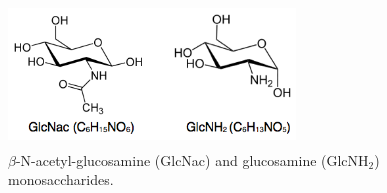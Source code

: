 



\begin{figure}[nag]
\centering
\includegraphics[height=1.5in, width=3in]{figures/results4/figure_pgab_sugars.png}
\caption[NAG]{$\beta$-N-acetyl-glucosamine (GlcNac) and glucosamine (GlcNH$_2$) monosaccharides.}
\label{fig:nag}
\end{figure}

